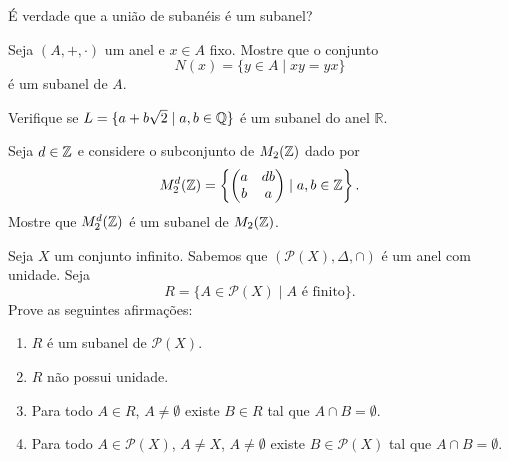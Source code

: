 \documentclass[12pt]{exam}
\begin{document}
    \vspace{.3cm}

    \questao{} \'E verdade que a uni\~ao de suban\'eis \'e um subanel?

    \vspace{.3cm}

    \questao{} Seja $(A, + , \cdot)$ um anel e $x \in A$ fixo. Mostre que o conjunto
    \[
        N(x) = \{y \in A \mid xy = yx\}
    \]
    \'e um subanel de $A$.

    \vspace{.3cm}

    \questao{} Verifique se $L = \{ a + b\sqrt{2} \mid a, b \in \mathbb{Q}\}$ {\'e} um subanel
    do anel $\mathbb{R}$.

    \vspace{.3cm}

    \questao{} Seja $d \in \mathbb{Z}$ e considere o subconjunto de $M_2(\mathbb{Z})$ dado por
    \[
        M_2^d(\mathbb{Z}) = \left\{\begin{pmatrix} a & db \\ b & a \end{pmatrix} \mid a, b \in \mathbb{Z}\right\}.
    \]
    Mostre que $M_2^d(\mathbb{Z})$ é um subanel de $M_2(\mathbb{Z})$.

    \vspace{.3cm}

    \questao{} Seja $X$ um conjunto infinito. Sabemos que $(\mathcal{P}(X), \Delta, \cap)$ é um anel com unidade. Seja
    \[
        R = \{A \in \mathcal{P}(X) \mid A \mbox{ é finito}\}.
    \]
    Prove as seguintes afirmações:
    \begin{enumerate}[label=({\alph*})]
        \item $R$ é um subanel de $\mathcal{P}(X)$.

        \item $R$ não possui unidade.

        \item Para todo $A \in R$, $A \ne \emptyset$ existe $B \in R$ tal que $A \cap B = \emptyset$.

        \item Para todo $A \in \mathcal{P}(X)$, $A \ne X$, $A \ne \emptyset$ existe $B \in \mathcal{P}(X)$ tal que $A \cap B = \emptyset$.
    \end{enumerate}
\end{document}
